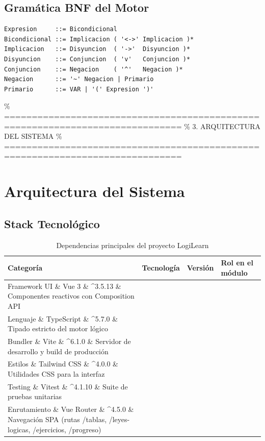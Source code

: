 \documentclass[11pt,a4paper]{article}
\begin{document}
\subsection{Gramática BNF del Motor}
\begin{verbatim}
Expresion     ::= Bicondicional
Bicondicional ::= Implicacion ( '<->' Implicacion )*
Implicacion   ::= Disyuncion  ( '->'  Disyuncion )*
Disyuncion    ::= Conjuncion  ( 'v'   Conjuncion )*
Conjuncion    ::= Negacion    ( '^'   Negacion )*
Negacion      ::= '~' Negacion | Primario
Primario      ::= VAR | '(' Expresion ')'
\end{verbatim}

\% ==============================================================================
\% 3. ARQUITECTURA DEL SISTEMA
\% ==============================================================================
\section{Arquitectura del Sistema}

\subsection{Stack Tecnológico}
\begin{table}[H]
\centering
\caption{Dependencias principales del proyecto LogiLearn}
\label{tab:stack}
\small
\begin{tabularx}{\textwidth}{llp{2cm}X}
\toprule
\textbf{Categoría} & \textbf{Tecnología} & \textbf{Versión} & \textbf{Rol en el módulo} \\
\midrule
Framework UI \& Vue 3 \& \textasciicircum 3.5.13 \& Componentes reactivos con Composition API \\
Lenguaje \& TypeScript \& \textasciicircum 5.7.0 \& Tipado estricto del motor lógico \\
Bundler \& Vite \& \textasciicircum 6.1.0 \& Servidor de desarrollo y build de producción \\
Estilos \& Tailwind CSS \& \textasciicircum 4.0.0 \& Utilidades CSS para la interfaz \\
Testing \& Vitest \& \textasciicircum 4.1.10 \& Suite de pruebas unitarias \\
Enrutamiento \& Vue Router \& \textasciicircum 4.5.0 \& Navegación SPA (rutas /tablas, /leyes-logicas, /ejercicios, /progreso) \\
\bottomrule
\end{tabularx}
\end{table}
\end{document}
